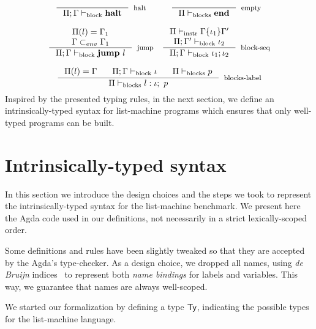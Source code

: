 \documentclass[sigconf]{acmart}
\theoremstyle{definition}
\newcommand{\D}[1]{\blue{\mathsf{#1}}}
\begin{document}
\[
\begin{array}{cc}
   \inference{}
             {\Pi;\Gamma\vdash_{\text{block}} \textbf{halt}}[halt]
   &
   \inference{}
             {\Pi\vdash_{\text{blocks}} \textbf{end}}[empty]\\ \\

   \inference{\Pi(l)=\Gamma_1\\ \Gamma \subset_{env} \Gamma_1}
             {\Pi;\Gamma\vdash_{\text{block}} \textbf{jump}~l}[jump]

   &

   \inference{\Pi\vdash_{\text{instr}} \Gamma\{\iota_1\}\Gamma'\\ \Pi;\Gamma'\vdash_{\text{block}} \iota_2}
             {\Pi;\Gamma\vdash_{\text{block}} \iota_1;\iota_2}[block-seq]
 \\ \\

   \multicolumn{2}{c}{
   \inference{\Pi(l)=\Gamma\:\:\:\:\:\:\:\:\Pi;\Gamma\vdash_{\text{block}} \iota\:\:\:\:\:\:\:\:\Pi\vdash_{\text{blocks}} p}
     {\Pi\vdash_{\text{blocks}} l: \iota;~p}[blocks-label]
    }
\end{array}
\]
Inspired by the presented typing rules, in the next section, we define an
intrinsically-typed syntax for list-machine programs which ensures that
only well-typed programs can be built.

\section{Intrinsically-typed syntax}\label{sec:typing}


In this section we introduce the design choices and the steps we took to represent the
intrinsically-typed syntax for the list-machine benchmark. We present here the Agda
code used in our definitions, not necessarily in a strict lexically-scoped order.

Some definitions and rules have been slightly tweaked so that they are accepted by
the Agda's type-checker. As a design choice, we dropped all names, using
\emph{de Bruijn} indices~\cite{DEBRUIJN72} to represent both \emph{name bindings}
for labels and variables. This way, we guarantee that names are always well-scoped.

We started our formalization by defining a type \ensuremath{\D{Ty}}, indicating the possible types
for the list-machine language.
\end{document}
